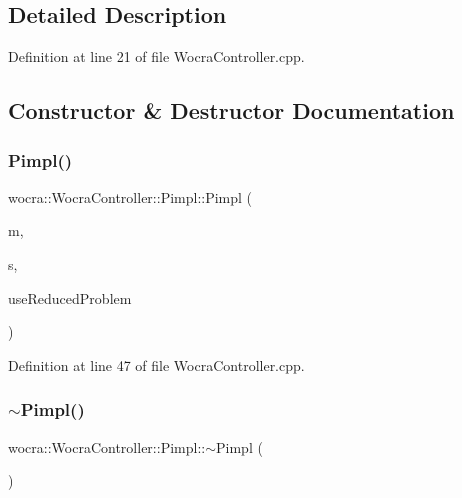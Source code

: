\subsection{Detailed Description}


Definition at line 21 of file Wocra\+Controller.\+cpp.



\subsection{Constructor \& Destructor Documentation}
\hypertarget{structwocra_1_1WocraController_1_1Pimpl_ae9e38baadd765c1005354808ea768800}{}\label{structwocra_1_1WocraController_1_1Pimpl_ae9e38baadd765c1005354808ea768800} 
\subsubsection{\texorpdfstring{Pimpl()}{Pimpl()}}
{\footnotesize\ttfamily wocra\+::\+Wocra\+Controller\+::\+Pimpl\+::\+Pimpl (\begin{DoxyParamCaption}\item[{std\+::shared\+\_\+ptr$<$ Model $>$}]{m,  }\item[{std\+::shared\+\_\+ptr$<$ \hyperlink{classocra_1_1OneLevelSolver}{One\+Level\+Solver} $>$}]{s,  }\item[{bool}]{use\+Reduced\+Problem }\end{DoxyParamCaption})\hspace{0.3cm}{\ttfamily [inline]}}



Definition at line 47 of file Wocra\+Controller.\+cpp.

\hypertarget{structwocra_1_1WocraController_1_1Pimpl_a9e7ca6582122e345e4d51d30ed481450}{}\label{structwocra_1_1WocraController_1_1Pimpl_a9e7ca6582122e345e4d51d30ed481450} 
\subsubsection{\texorpdfstring{$\sim$\+Pimpl()}{~Pimpl()}}
{\footnotesize\ttfamily wocra\+::\+Wocra\+Controller\+::\+Pimpl\+::$\sim$\+Pimpl (\begin{DoxyParamCaption}{ }\end{DoxyParamCaption})\hspace{0.3cm}{\ttfamily [inline]}}



